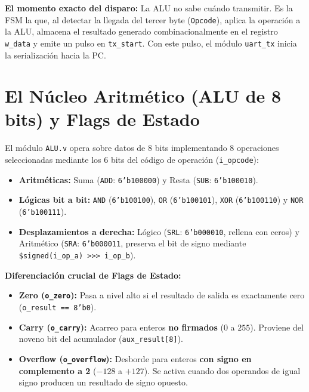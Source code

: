 \documentclass[10.5pt,a4paper]{article}
\begin{document}
\textbf{El momento exacto del disparo:} La ALU no sabe cuándo transmitir. Es la FSM la que, al detectar la llegada del tercer byte (\texttt{Opcode}), aplica la operación a la ALU, almacena el resultado generado combinacionalmente en el registro \texttt{w\_data} y emite un pulso en \texttt{tx\_start}. Con este pulso, el módulo \texttt{uart\_tx} inicia la serialización hacia la PC.

\newpage

\section{El Núcleo Aritmético (ALU de 8 bits) y Flags de Estado}
El módulo \texttt{ALU.v} opera sobre datos de 8 bits implementando 8 operaciones seleccionadas mediante los 6 bits del código de operación (\texttt{i\_opcode}):
\begin{itemize}\setlength\itemsep{0.05em}
    \item \textbf{Aritméticas:} Suma (\texttt{ADD}: \texttt{6'b100000}) y Resta (\texttt{SUB}: \texttt{6'b100010}).
    \item \textbf{Lógicas bit a bit:} \texttt{AND} (\texttt{6'b100100}), \texttt{OR} (\texttt{6'b100101}), \texttt{XOR} (\texttt{6'b100110}) y \texttt{NOR} (\texttt{6'b100111}).
    \item \textbf{Desplazamientos a derecha:} Lógico (\texttt{SRL}: \texttt{6'b000010}, rellena con ceros) y Aritmético (\texttt{SRA}: \texttt{6'b000011}, preserva el bit de signo mediante \verb|$signed(i_op_a) >>> i_op_b|).
\end{itemize}

\textbf{Diferenciación crucial de Flags de Estado:}
\begin{itemize}\setlength\itemsep{0.05em}
    \item \textbf{Zero (\texttt{o\_zero}):} Pasa a nivel alto si el resultado de salida es exactamente cero (\texttt{o\_result == 8'b0}).
    \item \textbf{Carry (\texttt{o\_carry}):} Acarreo para enteros \textbf{no firmados} ($0$ a $255$). Proviene del noveno bit del acumulador (\texttt{aux\_result[8]}).
    \item \textbf{Overflow (\texttt{o\_overflow}):} Desborde para enteros \textbf{con signo en complemento a 2} ($-128$ a $+127$). Se activa cuando dos operandos de igual signo producen un resultado de signo opuesto.
\end{itemize}
\end{document}
